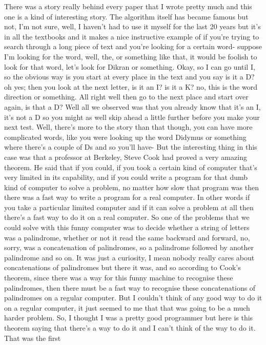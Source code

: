 \documentclass[]{article}
\begin{document}
There was a story really behind every paper that I wrote pretty much and
this one is a kind of interesting story. The algorithm itself has became
famous but not, I'm not sure, well, I haven't had to use it myself for
the last 20 years but it's in all the textbooks and it makes a nice
instructive example of if you're trying to search through a long piece
of text and you're looking for a certain word- suppose I'm looking for
the word, well, the, or something like that, it would be foolish to look
for that word, let's look for Dikran or something. Okay, so I can go
until I, so the obvious way is you start at every place in the text and
you say is it a D? oh yes; then you look at the next letter, is it an I?
is it a K? no, this is the word direction or something. All right well
then go to the next place and start over again, is that a D? Well all we
observed was that you already know that it's an I, it's not a D so you
might as well skip ahead a little further before you make your next
test. Well, there's more to the story than that though, you can have
more complicated words, like you were looking up the word Didymus or
something where there's a couple of Ds and so you'll have- But the
interesting thing in this case was that a professor at Berkeley, Steve
Cook had proved a very amazing theorem. He said that if you could, if
you took a certain kind of computer that's very limited in its
capability, and if you could write a program for that dumb kind of
computer to solve a problem, no matter how slow that program was then
there was a fast way to write a program for a real computer. In other
words if you take a particular limited computer and if it can solve a
problem at all then there's a fast way to do it on a real computer. So
one of the problems that we could solve with this funny computer was to
decide whether a string of letters was a palindrome, whether or not it
read the same backward and forward, no, sorry, was a concatenation of
palindromes, so a palindrome followed by another palindrome and so on.
It was just a curiosity, I mean nobody really cares about concatenations
of palindromes but there it was, and so according to Cook's theorem,
since there was a way for this funny machine to recognise these
palindromes, then there must be a fast way to recognise these
concatenations of palindromes on a regular computer. But I couldn't
think of any good way to do it on a regular computer, it just seemed to
me that that was going to be a much harder problem. So, I thought I was
a pretty good programmer but here is this theorem saying that there's a
way to do it and I can't think of the way to do it. That was the first
\end{document}
